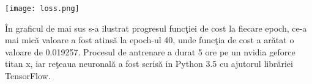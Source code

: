 \begin{center}
\texttt{[image: loss.png]}
\end{center}

\^{I}n graficul de mai sus s-a ilustrat progresul func\c{t}iei de cost la fiecare epoch, ce-a mai mic\u{a} valoare a fost atins\u{a} la epoch-ul 40, unde func\c{t}ia de cost a ar\u{a}tat o valoare de 0.019257. Procesul de antrenare a durat 5 ore pe un nvidia geforce titan x, iar re\c{t}eaua neuronal\u{a} a fost scris\u{a} in Python 3.5 cu ajutorul libr\u{a}riei TensorFlow.